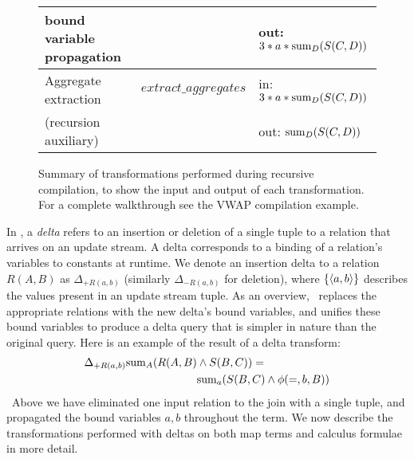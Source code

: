 \begin{figure*}[htbp]
\begin{center}
\begin{tabular}{|l|c|l|}
\\
bound variable propagation & & out:
    $3*a*\mathrm{sum}_{D}(S(C,D))$
\\
\hline Aggregate extraction        & $extract\_aggregates$
& in: $3*a*\mathrm{sum}_{D}(S(C,D))$
\\
(recursion auxiliary) & & out: $\mathrm{sum}_{D}(S(C,D))$
\\
\hline
\end{tabular}
\caption{Summary of transformations performed during recursive compilation, to
show the input and output of each transformation. For a complete walkthrough see
the VWAP compilation example.}
\label{fig:methodsummary}
\end{center}
\end{figure*}


In \compiler, a \textit{delta} refers to an insertion or deletion of a single
tuple to a relation that arrives on an update stream. A delta corresponds to a
binding of a relation's variables to constants at runtime. We denote an
insertion delta to a relation $R(A,B)$ as $\Delta_{+R(a,b)}$ (similarly
$\Delta_{-R(a,b)}$ for deletion), where $\{{\langle a,b\rangle}\}$ describes the values
present in an update stream tuple. As an overview, \compiler\ replaces the
appropriate relations with the new delta's bound variables, and unifies these
bound variables to produce a delta query that is simpler in nature than the
original query.
Here is an example of the result of a delta transform:
\begin{align*}
\Delta_{+R(a,b)} \mathrm{sum}_{A}(R(A,B) & \wedge S(B,C)) =\\
& \mathrm{sum}_{a}(S(B,C) \wedge \phi(=,b,B))
\end{align*}
\noindent~Above we have eliminated one input relation to the join
with a single tuple, and propagated the bound variables $a,b$ throughout the
term.  We now describe the transformations performed with deltas on both map
terms and calculus formulae in more detail.

